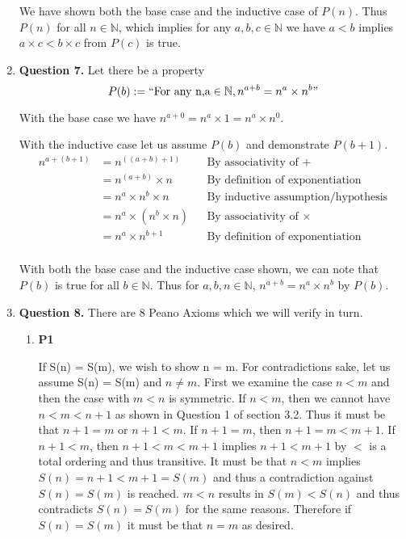 \documentclass{article}
\begin{document}
\begin{enumerate}
		\medskip
		We have shown both the base case and the inductive case of $P(n)$. Thus $P(n)$ for all $n \in \mathbb{N}$, which implies for any $a,b,c \in \mathbb{N}$ we have $a < b$ implies $a \times c < b \times c$ from $P(c)$ is true.
		
		\newpage
		\item \textbf{Question 7.}
		Let there be a property $$P(b) := ``\text{For any n,a} \in \mathbb{N}, n^{a + b} = n^{a} \times n^{b} \text{''}$$
		
		\medskip
		With the base case we have $n^{a + 0} = n^{a} \times 1 = n^{a} \times n^{0}$.
		
		\medskip
		With the inductive case let us assume $P(b)$ and demonstrate $P(b + 1)$. 
		\begin{align*}
			n^{a + (b + 1)} &= n^{((a + b) + 1)} && \text{By associativity of $+$}\\
			&= n^{(a + b)} \times n && \text{By definition of exponentiation}\\
			&= n^{a} \times n^{b} \times n && \text{By inductive assumption/hypothesis}\\
			&= n^{a} \times (n^{b} \times n) && \text{By associativity of $\times$}\\
			&= n^{a} \times n^{b + 1} && \text{By definition of exponentiation}\\
		\end{align*}
		
		\medskip
		With both the base case and the inductive case shown, we can note that $P(b)$ is true for all $b \in \mathbb{N}$. Thus for $a,b,n \in \mathbb{N}$, $n^{a + b} = n^{a} \times n^{b}$ by $P(b)$.
		
		\item \textbf{Question 8.}
		There are 8 Peano Axioms which we will verify in turn.
		
		\begin{enumerate}
			\item \textbf{P1}
			
			If S(n) = S(m), we wish to show n = m. For contradictions sake, let us assume S(n) = S(m) and $n \neq m$. First we examine the case $n < m$ and then the case with $m < n$ is symmetric. If $n < m$, then we cannot have $n < m < n + 1$ as shown in Question 1 of section 3.2. Thus it must be that $n + 1 = m$ or $n + 1 < m$. If $n + 1 = m$, then $n + 1 = m < m + 1$. If $n + 1 < m$, then $n + 1 < m < m + 1$ implies $n + 1 < m + 1$ by $<$ is a total ordering and thus transitive. It must be that $n < m$ implies $S(n) = n + 1 < m + 1 = S(m)$ and thus a contradiction against $S(n) = S(m)$ is reached. $m < n$ results in $S(m) < S(n)$ and thus contradicts $S(n) = S(m)$ for the same reasons. Therefore if $S(n) = S(m)$ it must be that $n = m$ as desired.
			

\end{enumerate}
\end{enumerate}
\end{document}
